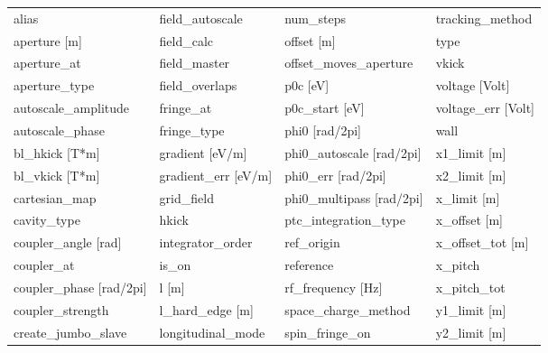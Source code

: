  \begin{tabular}{llll} \toprule
alias                          & field_autoscale                & num_steps                      & tracking_method                \\
aperture [m]                   & field_calc                     & offset [m]                     & type                           \\
aperture_at                    & field_master                   & offset_moves_aperture          & vkick                          \\
aperture_type                  & field_overlaps                 & p0c [eV]                       & voltage [Volt]                 \\
autoscale_amplitude            & fringe_at                      & p0c_start [eV]                 & voltage_err [Volt]             \\
autoscale_phase                & fringe_type                    & phi0 [rad/2pi]                 & wall                           \\
bl_hkick [T*m]                 & gradient [eV/m]                & phi0_autoscale [rad/2pi]       & x1_limit [m]                   \\
bl_vkick [T*m]                 & gradient_err [eV/m]            & phi0_err [rad/2pi]             & x2_limit [m]                   \\
cartesian_map                  & grid_field                     & phi0_multipass [rad/2pi]       & x_limit [m]                    \\
cavity_type                    & hkick                          & ptc_integration_type           & x_offset [m]                   \\
coupler_angle [rad]            & integrator_order               & ref_origin                     & x_offset_tot [m]               \\
coupler_at                     & is_on                          & reference                      & x_pitch                        \\
coupler_phase [rad/2pi]        & l [m]                          & rf_frequency [Hz]              & x_pitch_tot                    \\
coupler_strength               & l_hard_edge [m]                & space_charge_method            & y1_limit [m]                   \\
create_jumbo_slave             & longitudinal_mode              & spin_fringe_on                 & y2_limit [m]                   \\

\end{tabular}
